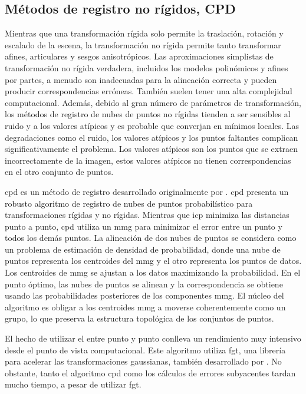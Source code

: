 \subsection{Métodos de registro no rígidos, CPD}
\label{subsec:metodos-registro-no-rigido-cpd}

Mientras que una transformación rígida solo permite la traslación, rotación y escalado de la escena, la transformación no rígida permite tanto transformar afines, articulares y sesgos anisotrópicos.
Las aproximaciones simplistas de transformación no rígida verdadera, incluidos los modelos polinómicos y afines por partes, a menudo son inadecuadas para la alineación correcta y pueden producir correspondencias erróneas.
También suelen tener una alta complejidad computacional.
Además, debido al gran número de parámetros de transformación, los métodos de registro de nubes de puntos no rígidas tienden a ser sensibles al ruido y a los valores atípicos y es probable que converjan en mínimos locales.
Las degradaciones como el ruido, los valores atípicos y los puntos faltantes complican significativamente el problema.
Los valores atípicos son los puntos que se extraen incorrectamente de la imagen, estos valores atípicos no tienen correspondencias en el otro conjunto de puntos.

\gls{cpd} es un método de registro desarrollado originalmente por \cite{Myronenko2010}.
\gls{cpd} presenta un robusto algoritmo de registro de nubes de puntos probabilístico para transformaciones rígidas y no rígidas.
Mientras que \gls{icp} minimiza las distancias punto a punto, \gls{cpd} utiliza un \gls{mmg} para minimizar el error entre un punto y todos los demás puntos.
La alineación de dos nubes de puntos se considera como un problema de estimación de densidad de probabilidad, donde una nube de puntos representa los centroides del \gls{mmg} y el otro representa los puntos de datos.
Los centroides de \gls{mmg} se ajustan a los datos maximizando la probabilidad.
En el punto óptimo, las nubes de puntos se alinean y la correspondencia se obtiene usando las probabilidades posteriores de los componentes \gls{mmg}.
El núcleo del algoritmo es obligar a los centroides \gls{mmg} a moverse coherentemente como un grupo, lo que preserva la estructura topológica de los conjuntos de puntos.

El hecho de utilizar el  entre punto y punto conlleva un rendimiento muy intensivo desde el punto de vista computacional.
Este algoritmo utiliza \gls{fgt}, una librería para acelerar las transformaciones gaussianas, también desarrollado por \cite{Myronenko2010}.
No obstante, tanto el algoritmo \gls{cpd} como los cálculos de errores subyacentes tardan mucho tiempo, a pesar de utilizar \gls{fgt}.

